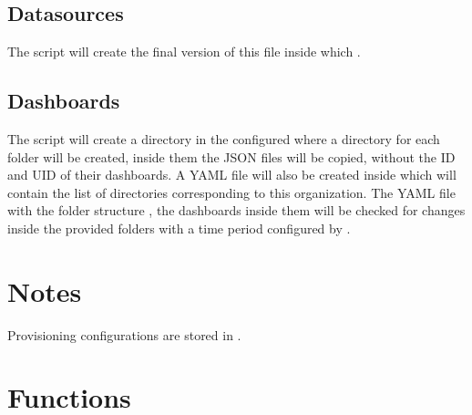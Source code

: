 \documentclass[letterpaper,10pt,english]{sphinxmanual}
\begin{document}
\subsection{Datasources}
\label{\detokenize{inputs:datasources}}
The script will create the final version of this file inside
 which .


\subsection{Dashboards}
\label{\detokenize{inputs:dashboards}}
The script will create a directory in the configured  where a
directory for each folder will be created, inside them the JSON files will be
copied, without the ID and UID of their dashboards. A YAML file will also be
created inside  which will contain the
list of directories corresponding to this organization. The YAML file with the
folder structure , the
dashboards inside them will be checked for changes inside the provided folders
with a time period configured by .


\section{Notes}
\label{\detokenize{inputs:notes}}
Provisioning configurations are stored in .


\section{Functions}
\label{\detokenize{inputs:functions}}
\end{document}
